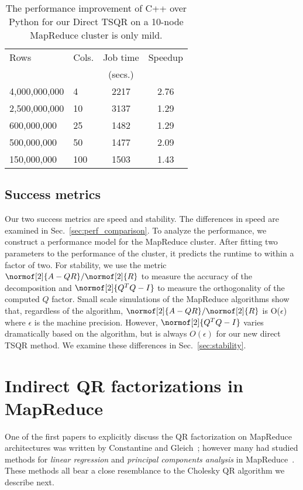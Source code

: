 \documentclass[10pt, conference, compsocconf]{IEEEtran}
\begin{document}
\begin{table}[tbp]
\vspace{-\baselineskip}
\centering
\caption{The performance improvement of C++ over Python for our  Direct TSQR on a 10-node MapReduce cluster is only mild.}
\begin{tabular}{l l @{\qquad} c c}
\toprule
Rows & Cols. & Job time & Speedup \\
           &            &  (secs.)   &                \\
\midrule
4,000,000,000 & 4     & 2217 & 2.76 \\
2,500,000,000 & 10   & 3137 & 1.29 \\
600,000,000    & 25   & 1482 & 1.29 \\
500,000,000    & 50   & 1477 & 2.09 \\
150,000,000    & 100 & 1503 & 1.43 \\
\bottomrule
\end{tabular}
\label{tab:perf_cxx}
\end{table}

\subsection{Success metrics}
Our two success metrics are speed and stability.  The differences in speed are examined in Sec.~\ref{sec:perf_comparison}.  To analyze the performance, we construct a performance model for the MapReduce cluster.  After fitting two parameters to the performance of the cluster, it predicts the runtime to within a factor of two.  For stability, we use the metric $\normof[2]{A - QR}/\normof[2]{R}$ to measure the accuracy of the decomposition and $\normof[2]{Q^TQ - I}$ to measure the orthogonality of the computed $Q$ factor.  Small scale simulations of the MapReduce algorithms show that, regardless of the algorithm, $\normof[2]{A - QR}/\normof[2]{R}$ is O($\epsilon$) where $\epsilon$ is the machine precision.  However, $\normof[2]{Q^TQ - I}$ varies dramatically based on the algorithm, but is always $O(\epsilon)$ for our new direct TSQR method.  We examine these differences in Sec.~\ref{sec:stability}.




\section{Indirect QR factorizations in MapReduce}\label{sec:indirect_QR}

One of the first papers to explicitly discuss the QR factorization on MapReduce architectures was written by Constantine and Gleich~\cite{Constantine-2011-TSQR-MapReduce}; however many had studied methods for \emph{linear regression} and \emph{principal components analysis} in MapReduce~\cite{Chu-2006-MapReduce}.  These methods all bear a close resemblance to the Cholesky QR algorithm we describe next.
\end{document}
